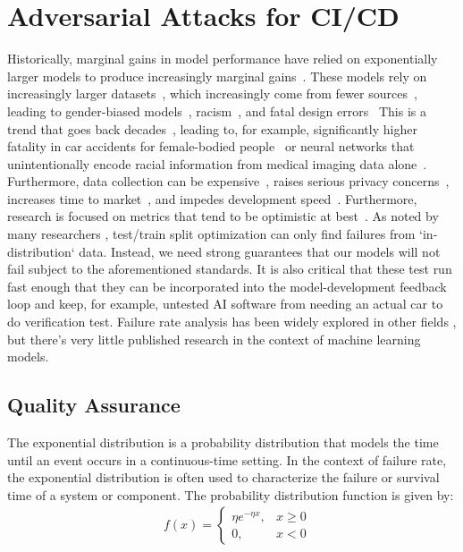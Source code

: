 \documentclass[conference]{IEEEtran}
\begin{document}
\section{Adversarial Attacks for CI/CD}
Historically, marginal gains in model performance have relied on exponentially larger models to produce increasingly marginal gains~\cite{desislavov2021compute}.  These models rely on increasingly larger datasets~\cite{desislavov2021compute, vapnik1994measuring, blumer1989learnability}, which increasingly come from fewer sources~\cite{koch2021reduced}, leading to gender-biased models~\cite{lu2020gender}, racism~\cite{buolamwini2018gender}, and fatal design errors~\cite{banks2018driver} This is a trend that goes back decades~\cite{corsaro1982something, ramirez2000resource, buolamwini2018gender}, leading to, for example, significantly higher fatality in car accidents for female-bodied people~\cite{evans2001gender} or neural networks that unintentionally encode racial information from medical imaging data alone~\cite{gichoya2022ai}. Furthermore, data collection can be expensive~\cite{roh2019survey}, raises serious privacy concerns~\cite{bloom2017self}, increases time to market~\cite{lam2004new}, and impedes development speed~\cite{zirger1996effect}. Furthermore, research is focused on metrics that tend to be optimistic at best~\cite{madry2017towards}. As noted by many researchers \cite{madry2017towards, carlini_towards_2017, croce_reliable_2020, meyers_1}, test/train split optimization can only find failures from `in-distribution` data. Instead, we need strong guarantees that our models will not fail subject to the aforementioned standards. It is also critical that these test run fast enough that they can be incorporated into the model-development feedback loop and keep, for example, untested AI software from needing an actual car to do verification test. Failure rate analysis has been widely explored in other fields \cite{aft_models}, but there's very little published research in the context of machine learning models.

\subsection{Quality Assurance}

The exponential distribution is a probability distribution that models the time until an event occurs in a continuous-time setting. In the context of failure rate, the exponential distribution is often used to characterize the failure or survival time of a system or component. The probability distribution function is given by:
\begin{align*}
& f(x) = \begin{cases}
\eta e^{-\eta x}, & x \geq 0 \\
0, & x < 0
\end{cases}\\
\end{align*}
\end{document}
